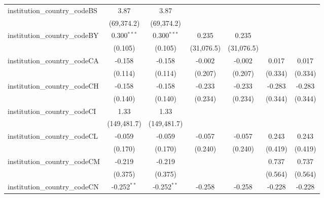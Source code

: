 \begin{tabular}{lcccccc}
   institution\_country\_codeBS          & 3.87           & 3.87           &                &                &                &   \\   
                                         & (69,374.2)     & (69,374.2)     &                &                &                &   \\   
   institution\_country\_codeBY          & 0.300$^{***}$  & 0.300$^{***}$  & 0.235          & 0.235          &                &   \\   
                                         & (0.105)        & (0.105)        & (31,076.5)     & (31,076.5)     &                &   \\   
   institution\_country\_codeCA          & -0.158         & -0.158         & -0.002         & -0.002         & 0.017          & 0.017\\   
                                         & (0.114)        & (0.114)        & (0.207)        & (0.207)        & (0.334)        & (0.334)\\   
   institution\_country\_codeCH          & -0.158         & -0.158         & -0.233         & -0.233         & -0.283         & -0.283\\   
                                         & (0.140)        & (0.140)        & (0.234)        & (0.234)        & (0.344)        & (0.344)\\   
   institution\_country\_codeCI          & 1.33           & 1.33           &                &                &                &   \\   
                                         & (149,481.7)    & (149,481.7)    &                &                &                &   \\   
   institution\_country\_codeCL          & -0.059         & -0.059         & -0.057         & -0.057         & 0.243          & 0.243\\   
                                         & (0.170)        & (0.170)        & (0.240)        & (0.240)        & (0.419)        & (0.419)\\   
   institution\_country\_codeCM          & -0.219         & -0.219         &                &                & 0.737          & 0.737\\   
                                         & (0.375)        & (0.375)        &                &                & (0.564)        & (0.564)\\   
   institution\_country\_codeCN          & -0.252$^{**}$  & -0.252$^{**}$  & -0.258         & -0.258         & -0.228         & -0.228\\   

\end{tabular}
